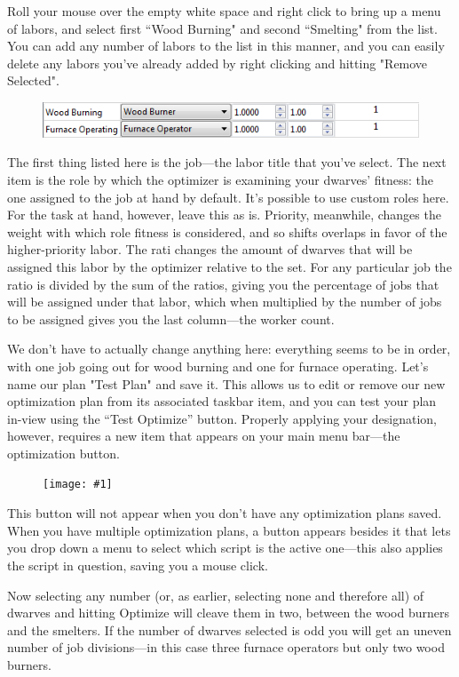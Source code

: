 \documentclass[]{article}
\newcommand{\fullfigure}[1] {
\begin{figure}[h!]
\texttt{[image: \#1]}
\end{figure}
}
\begin{document}
Roll your mouse over the empty white space and right click to bring up a menu of labors, and select first
``Wood Burning" and second ``Smelting" from the list. You can add any number of labors to the list in
this manner, and you can easily delete any labors you've already added by right clicking and hitting
"Remove Selected".

\begin{figure}[h!]
\centering
\includegraphics[scale=1]{Sec4Fig7}
\end{figure}

The first thing listed here is the job---the labor title that you've select. The next item is the role by
which the optimizer is examining your dwarves' fitness: the one assigned to the job at hand by default.
It's possible to use custom roles here. For the task at hand, however, leave this as is. Priority,
meanwhile, changes the weight with which role fitness is considered, and so shifts overlaps in favor of
the higher-priority labor. The rati changes the amount of dwarves that will be
assigned this labor by the optimizer relative to the set. For any particular job the ratio is
divided by the sum of the ratios, giving you the percentage of jobs that will be assigned under that
labor, which when multiplied by the number of jobs to be assigned gives you the last column---the worker
count.

We don't have to actually change anything here: everything seems to be in order, with one job going out
for wood burning and one for furnace operating. Let's name our plan "Test Plan" and save it. This allows
us to edit or remove our new optimization plan from its associated taskbar item, and you can test your
plan in-view using the ``Test Optimize'' button. Properly applying your designation, however,
requires a new item that appears on your main menu bar---the optimization button.

\fullfigure{Sec4Fig8}

This button will not appear when you don't have any optimization plans saved. When you have multiple
optimization plans, a button appears besides it that lets you drop down a menu to select which script is
the active one---this also applies the script in question, saving you a mouse click.

Now selecting any number (or, as earlier, selecting none and therefore all) of dwarves and
hitting Optimize will cleave them in two, between the wood burners and the smelters. If the number of
dwarves selected is odd you will get an uneven number of job divisions---in this case three furnace
operators but only two wood burners.
\end{document}
